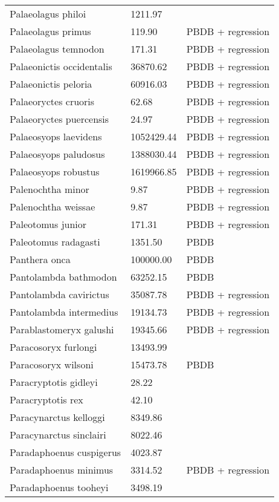 \documentclass{article}
\begin{document}
\begin{center}
\begin{longtable}{p{} p{} p{} }
  Palaeolagus philoi & 1211.97 & \cite{Tomiya2013} \\ 
  Palaeolagus primus & 119.90 & PBDB + regression \\ 
  Palaeolagus temnodon & 171.31 & PBDB + regression \\ 
  Palaeonictis occidentalis & 36870.62 & PBDB + regression \\ 
  Palaeonictis peloria & 60916.03 & PBDB + regression \\ 
  Palaeoryctes cruoris & 62.68 & PBDB + regression \\ 
  Palaeoryctes puercensis & 24.97 & PBDB + regression \\ 
  Palaeosyops laevidens & 1052429.44 & PBDB + regression \\ 
  Palaeosyops paludosus & 1388030.44 & PBDB + regression \\ 
  Palaeosyops robustus & 1619966.85 & PBDB + regression \\ 
  Palenochtha minor & 9.87 & PBDB + regression \\ 
  Palenochtha weissae & 9.87 & PBDB + regression \\ 
  Paleotomus junior & 171.31 & PBDB + regression \\ 
  Paleotomus radagasti & 1351.50 & PBDB \\ 
  Panthera onca & 100000.00 & PBDB \\ 
  Pantolambda bathmodon & 63252.15 & PBDB \\ 
  Pantolambda cavirictus & 35087.78 & PBDB + regression \\ 
  Pantolambda intermedius & 19134.73 & PBDB + regression \\ 
  Parablastomeryx galushi & 19345.66 & PBDB + regression \\ 
  Paracosoryx furlongi & 13493.99 & \cite{Tomiya2013} \\ 
  Paracosoryx wilsoni & 15473.78 & PBDB \\ 
  Paracryptotis gidleyi & 28.22 & \cite{Tomiya2013} \\ 
  Paracryptotis rex & 42.10 & \cite{Tomiya2013} \\ 
  Paracynarctus kelloggi & 8349.86 & \cite{Tomiya2013} \\ 
  Paracynarctus sinclairi & 8022.46 & \cite{Tomiya2013} \\ 
  Paradaphoenus cuspigerus & 4023.87 & \cite{Tomiya2013} \\ 
  Paradaphoenus minimus & 3314.52 & PBDB + regression \\ 
  Paradaphoenus tooheyi & 3498.19 & \cite{Tomiya2013} \\ 

\end{longtable}
\end{center}
\end{document}
